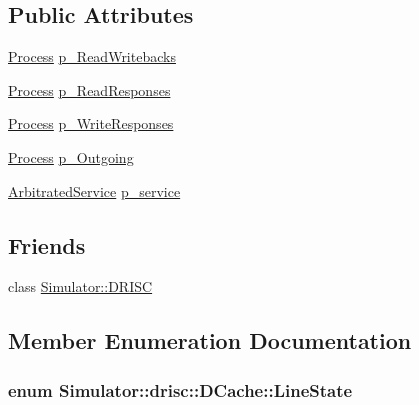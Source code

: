 \subsection*{Public Attributes}
\begin{DoxyCompactItemize}
\item 
\hyperlink{class_simulator_1_1_process}{Process} \hyperlink{class_simulator_1_1drisc_1_1_d_cache_ae91cc8d03d3b83d7ee241b9246dc32d5}{p\+\_\+\+Read\+Writebacks}
\item 
\hyperlink{class_simulator_1_1_process}{Process} \hyperlink{class_simulator_1_1drisc_1_1_d_cache_aa9b6ca8eebcaa56bc0c0f58c6a5e80c5}{p\+\_\+\+Read\+Responses}
\item 
\hyperlink{class_simulator_1_1_process}{Process} \hyperlink{class_simulator_1_1drisc_1_1_d_cache_aaf3fd21ca8cd24b70348ccd7452c7ce7}{p\+\_\+\+Write\+Responses}
\item 
\hyperlink{class_simulator_1_1_process}{Process} \hyperlink{class_simulator_1_1drisc_1_1_d_cache_a23700618e332cbeea5634f08f2c18521}{p\+\_\+\+Outgoing}
\item 
\hyperlink{class_simulator_1_1_arbitrated_service}{Arbitrated\+Service} \hyperlink{class_simulator_1_1drisc_1_1_d_cache_a3f008676ba7517b2e9a3968c9be1d519}{p\+\_\+service}
\end{DoxyCompactItemize}
\subsection*{Friends}
\begin{DoxyCompactItemize}
\item 
class \hyperlink{class_simulator_1_1drisc_1_1_d_cache_a14f94eb83e17d9d8841f39b37431d673}{Simulator\+::\+D\+R\+I\+S\+C}
\end{DoxyCompactItemize}


\subsection{Member Enumeration Documentation}
\hypertarget{class_simulator_1_1drisc_1_1_d_cache_aab0700229ca4e63558dd73cb40ee0b71}{
\subsubsection[{Line\+State}]{\setlength{\rightskip}{0pt plus 5cm}enum {\bf Simulator\+::drisc\+::\+D\+Cache\+::\+Line\+State}}}\label{class_simulator_1_1drisc_1_1_d_cache_aab0700229ca4e63558dd73cb40ee0b71}


